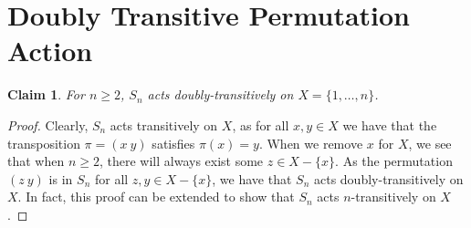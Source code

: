 \documentclass[12pt]{article}
\newtheorem*{claim*}{Claim}
\begin{document}
\section{Doubly Transitive Permutation Action}
\begin{claim*}
For $n \geq 2$, $S_n$ acts doubly-transitively on $X = \{1,\ldots,n\}$. 
\end{claim*}
\begin{proof}
Clearly, $S_n$ acts transitively on $X$, as for all $x,y \in X$ we have that the transposition $\pi = (x\ y)$ satisfies $\pi(x) = y$. When we remove $x$ for $X$, we see that when $n \geq 2$, there will always exist some $z \in X - \{x\}$. As the permutation $(z\ y)$ is in $S_n$ for all $z,y \in X - \{x\}$, we have that $S_n$ acts doubly-transitively on $X$. In fact, this proof can be extended to show that  $S_n$ acts $n$-transitively on $X$.
\end{proof}
\end{document}
